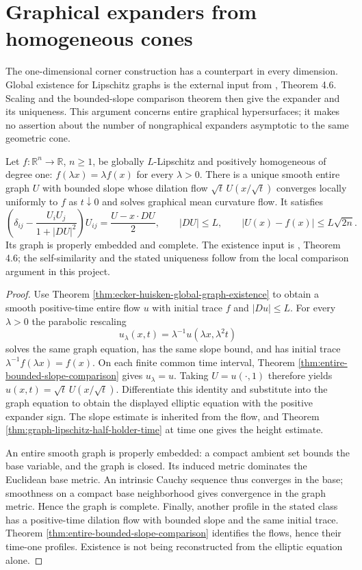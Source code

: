 \chapter{Graphical expanders from homogeneous cones}\label{sec:examples-homogeneous-expanders}
The one-dimensional corner construction has a counterpart in every dimension. Global existence for Lipschitz graphs is the external input from \cite{EH89}, Theorem 4.6. Scaling and the bounded-slope comparison theorem then give the expander and its uniqueness. This argument concerns entire graphical hypersurfaces; it makes no assertion about the number of nongraphical expanders asymptotic to the same geometric cone.

\begin{theorem}\label{thm:lipschitz-cone-graphical-expander}
Let $f:\mathbb R^n\to\mathbb R$, $n\geq1$, be globally $L$-Lipschitz and positively homogeneous of degree one: $f(\lambda x)=\lambda f(x)$ for every $\lambda>0$. There is a unique smooth entire graph $U$ with bounded slope whose dilation flow $\sqrt t\,U(x/\sqrt t)$ converges locally uniformly to $f$ as $t\downarrow0$ and solves graphical mean curvature flow. It satisfies
\[
 \left(\delta_{ij}-\frac{U_iU_j}{1+|DU|^2}\right)U_{ij}
       =\frac{U-x\cdot DU}{2},\qquad |DU|\leq L,
 \qquad |U(x)-f(x)|\leq L\sqrt{2n}.
\]
Its graph is properly embedded and complete. The existence input is \cite{EH89}, Theorem 4.6; the self-similarity and the stated uniqueness follow from the local comparison argument in this project.
\end{theorem}
\begin{proof}
Use Theorem \ref{thm:ecker-huisken-global-graph-existence} to obtain a smooth positive-time entire flow $u$ with initial trace $f$ and $|Du|\leq L$. For every $\lambda>0$ the parabolic rescaling
\[
 u_\lambda(x,t)=\lambda^{-1}u(\lambda x,\lambda^2t)
\]
solves the same graph equation, has the same slope bound, and has initial trace $\lambda^{-1}f(\lambda x)=f(x)$. On each finite common time interval, Theorem \ref{thm:entire-bounded-slope-comparison} gives $u_\lambda=u$. Taking $U=u(\cdot,1)$ therefore yields $u(x,t)=\sqrt t\,U(x/\sqrt t)$. Differentiate this identity and substitute into the graph equation to obtain the displayed elliptic equation with the positive expander sign. The slope estimate is inherited from the flow, and Theorem \ref{thm:graph-lipschitz-half-holder-time} at time one gives the height estimate.

An entire smooth graph is properly embedded: a compact ambient set bounds the base variable, and the graph is closed. Its induced metric dominates the Euclidean base metric. An intrinsic Cauchy sequence thus converges in the base; smoothness on a compact base neighborhood gives convergence in the graph metric. Hence the graph is complete. Finally, another profile in the stated class has a positive-time dilation flow with bounded slope and the same initial trace. Theorem \ref{thm:entire-bounded-slope-comparison} identifies the flows, hence their time-one profiles. Existence is not being reconstructed from the elliptic equation alone.
\end{proof}

